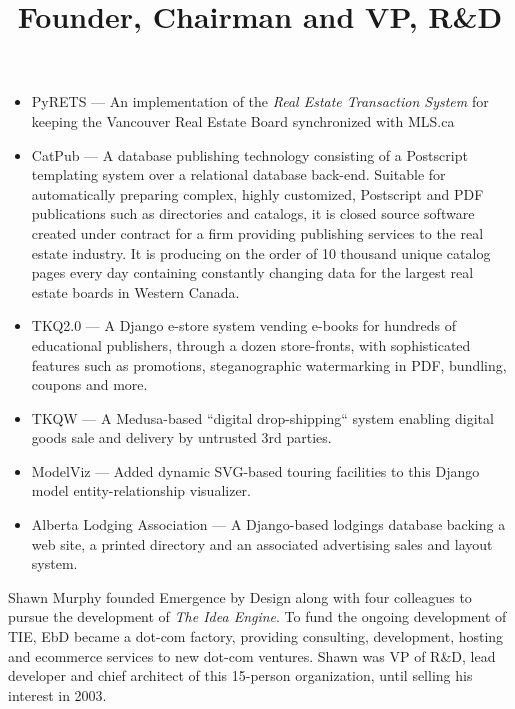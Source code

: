 \documentclass[line,margin]{res}
\begin{document}
\begin{resume}
\begin{position}
\begin{itemize}
  \item PyRETS --- An implementation of the \emph{Real Estate Transaction System}
  for keeping the Vancouver Real Estate Board synchronized with MLS.ca

  \item CatPub --- A database publishing technology consisting of a
  Postscript templating system over a relational database back-end.
  Suitable for automatically preparing complex, highly customized,
  Postscript and PDF publications such as directories and catalogs,
  it is closed source software created under contract for a firm
  providing publishing services to the real estate industry.
  It is producing on the order of 10 thousand unique catalog pages
  every day containing constantly changing data for the largest
  real estate boards in Western Canada.

  \item TKQ2.0 --- A Django e-store system vending e-books for hundreds
  of educational publishers, through a dozen store-fronts, with sophisticated
  features such as promotions, steganographic watermarking in PDF, bundling,
  coupons and more.

  \item TKQW --- A Medusa-based ``digital drop-shipping`` system
  enabling digital goods sale and delivery by untrusted 3rd parties.

  \item ModelViz --- Added dynamic SVG-based touring facilities to this Django
  model entity-relationship visualizer.

  \item Alberta Lodging Association --- A Django-based lodgings database
  backing a web site, a printed directory and an associated advertising
  sales and layout system.

\end{itemize}

\end{position}




\title{ Founder, Chairman and VP, R\&D }

\begin{position}
  Shawn Murphy founded Emergence by Design along with four colleagues to pursue
  the development of \emph{The Idea Engine}.  To fund the ongoing development of
  TIE, EbD became a dot-com factory, providing consulting,
  development, hosting and ecommerce services to new dot-com ventures.
  Shawn was VP of R\&D, lead developer and chief architect of this 15-person
  organization, until selling his interest in 2003.


\end{position}
\end{resume}
\end{document}
